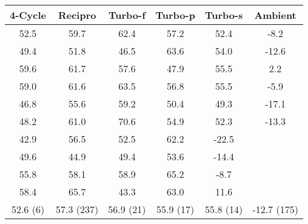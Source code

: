 \begin{tabular}{cccccc}
  \hline
  \textbf{4-Cycle} & \textbf{Recipro} & \textbf{Turbo-f} & \textbf{Turbo-p} & \textbf{Turbo-s} & \textbf{Ambient} \\
  \hline
  \hline
  52.5 & 59.7 & 62.4 & 57.2 & 52.4 & -8.2 \\
  49.4 & 51.8 & 46.5 & 63.6 & 54.0 & -12.6 \\
  59.6 & 61.7 & 57.6 & 47.9 & 55.5 & 2.2 \\
  59.0 & 61.6 & 63.5 & 56.8 & 55.5 & -5.9 \\
  46.8 & 55.6 & 59.2 & 50.4 & 49.3 & -17.1 \\
  48.2 & 61.0 & 70.6 & 54.9 & 52.3 & -13.3 \\
  42.9 & 56.5 & 52.5 & 62.2 & -22.5 \\
  49.6 & 44.9 & 49.4 & 53.6 & -14.4 \\
  55.8 & 58.1 & 58.9 & 65.2 & -8.7 \\
  58.4 & 65.7 & 43.3 & 63.0 & 11.6 \\
  \hline
  52.6 (6) & 57.3 (237) & 56.9 (21) & 55.9 (17) & 55.8 (14) & -12.7 (175) \\
  \hline
\end{tabular}
